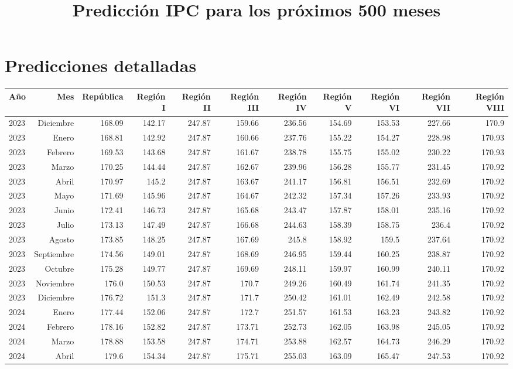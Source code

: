 \documentclass{article}%
\title{Predicción IPC para los próximos 500 meses}%
\date{}%
\begin{document}
%
\normalsize%
\maketitle%
\section*{Predicciones detalladas}%
\label{sec:Prediccionesdetalladas}%
\begin{longtable}{|l r|r|r|r|r|r|r|r|r|r|}%
\hline%
Año&Mes&República&Región I&Región II&Región III&Región IV&Región V&Región VI&Región VII&Región VIII\\%
\hline%
2023&Diciembre&168.09&142.17&247.87&159.66&236.56&154.69&153.53&227.66&170.9\\%
2023&Enero&168.81&142.92&247.87&160.66&237.76&155.22&154.27&228.98&170.93\\%
2023&Febrero&169.53&143.68&247.87&161.67&238.78&155.75&155.02&230.22&170.93\\%
2023&Marzo&170.25&144.44&247.87&162.67&239.96&156.28&155.77&231.45&170.92\\%
2023&Abril&170.97&145.2&247.87&163.67&241.17&156.81&156.51&232.69&170.92\\%
2023&Mayo&171.69&145.96&247.87&164.67&242.32&157.34&157.26&233.93&170.92\\%
2023&Junio&172.41&146.73&247.87&165.68&243.47&157.87&158.01&235.16&170.92\\%
2023&Julio&173.13&147.49&247.87&166.68&244.63&158.39&158.75&236.4&170.92\\%
2023&Agosto&173.85&148.25&247.87&167.69&245.8&158.92&159.5&237.64&170.92\\%
2023&Septiembre&174.56&149.01&247.87&168.69&246.95&159.44&160.25&238.87&170.92\\%
2023&Octubre&175.28&149.77&247.87&169.69&248.11&159.97&160.99&240.11&170.92\\%
2023&Noviembre&176.0&150.53&247.87&170.7&249.26&160.49&161.74&241.35&170.92\\%
2023&Diciembre&176.72&151.3&247.87&171.7&250.42&161.01&162.49&242.58&170.92\\%
2024&Enero&177.44&152.06&247.87&172.7&251.57&161.53&163.23&243.82&170.92\\%
2024&Febrero&178.16&152.82&247.87&173.71&252.73&162.05&163.98&245.05&170.92\\%
2024&Marzo&178.88&153.58&247.87&174.71&253.88&162.57&164.73&246.29&170.92\\%
2024&Abril&179.6&154.34&247.87&175.71&255.03&163.09&165.47&247.53&170.92\\%

\end{longtable}
\end{document}
